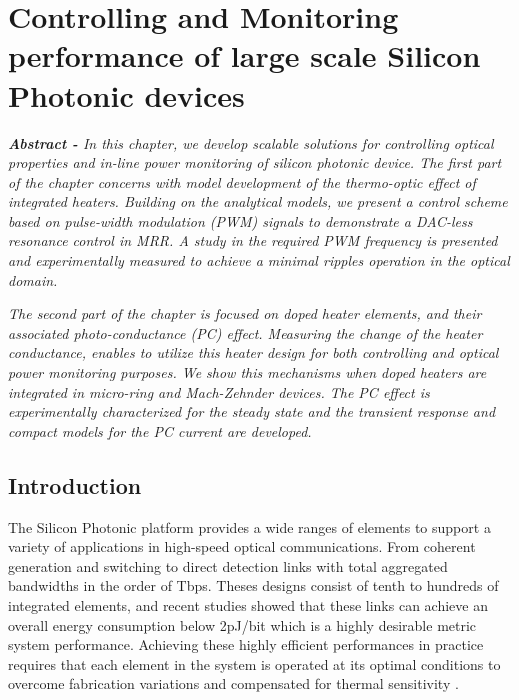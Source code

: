 
\pagestyle{plain}

\chapter[Controlling and Monitoring performance of large scale Silicon Photonic devices][Top of Page Title]{Controlling and Monitoring performance of large scale Silicon Photonic devices}

\textit{\textbf{Abstract - } In this chapter, we develop scalable solutions for controlling optical properties and in-line power monitoring of silicon photonic device. The first part of the chapter concerns with model development of the thermo-optic effect of integrated heaters. Building on the analytical models, we present a control scheme based on pulse-width modulation (PWM) signals to demonstrate a DAC-less resonance control in MRR. A study in the required PWM frequency is presented and experimentally measured to achieve a minimal ripples operation in the optical domain.}

\textit{The second part of the chapter is focused on doped heater elements, and their associated photo-conductance (PC) effect. Measuring the change of the heater conductance, enables to utilize this heater design for both controlling and optical power monitoring purposes. We show this mechanisms when doped heaters are integrated in micro-ring and Mach-Zehnder devices. The PC effect is experimentally characterized for the steady state and the transient response and compact models for the PC current are developed.}

\section{Introduction}

The Silicon Photonic platform provides a wide ranges of elements to support a variety of applications in high-speed optical communications. From coherent generation \cite{novack2018silicon} and switching \cite{vujicic2017software} to direct detection \cite{aoki2017low} links with total aggregated bandwidths in the order of Tbps. Theses designs consist of tenth to hundreds of integrated elements, and recent studies showed that these links can achieve an overall energy consumption below 2pJ/bit \cite{bahadori2016energy,bahadori2017energy} which is a highly desirable metric system performance. Achieving these highly efficient performances in practice requires that each element in the system is operated at its optimal conditions to overcome fabrication variations \cite{chrostowski2014impact} and compensated for thermal sensitivity \cite{padmaraju2014resolving}. 

